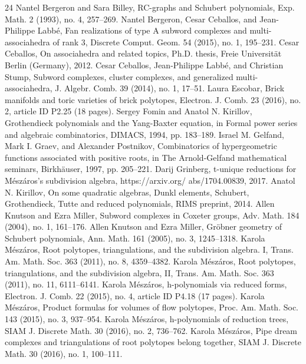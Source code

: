 \begin{thebibliography}{24}
 Nantel Bergeron and Sara Billey, RC-graphs and Schubert polynomials, Exp. Math. 2 (1993), no. 4, 257–269.
 Nantel Bergeron, Cesar Ceballos, and Jean-Philippe Labbé, Fan realizations of type A subword complexes and multi-associahedra of rank 3, Discrete Comput. Geom. 54 (2015), no. 1, 195–231.
 Cesar Ceballos, On associahedra and related topics, Ph.D. thesis, Freie Universität Berlin (Germany), 2012.
 Cesar Ceballos, Jean-Philippe Labbé, and Christian Stump, Subword complexes, cluster complexes, and generalized multi-associahedra, J. Algebr. Comb. 39 (2014), no. 1, 17–51.
 Laura Escobar, Brick manifolds and toric varieties of brick polytopes, Electron. J. Comb. 23 (2016), no. 2, article ID P2.25 (18 pages).
 Sergey Fomin and Anatol N. Kirillov, Grothendieck polynomials and the Yang-Baxter equation, in Formal power series and algebraic combinatorics, DIMACS, 1994, pp. 183–189.
 Israel M. Gelfand, Mark I. Graev, and Alexander Postnikov, Combinatorics of hypergeometric functions associated with positive roots, in The Arnold-Gelfand mathematical seminars, Birkhäuser, 1997, pp. 205–221.
 Darij Grinberg, t-unique reductions for Mészáros’s subdivision algebra, https://arxiv.org/ abs/1704.00839, 2017.
 Anatol N. Kirillov, On some quadratic algebras, Dunkl elements, Schubert, Grothendieck, Tutte and reduced polynomials, RIMS preprint, 2014.
 Allen Knutson and Ezra Miller, Subword complexes in Coxeter groups, Adv. Math. 184 (2004), no. 1, 161–176.
 Allen Knutson and Ezra Miller, Gröbner geometry of Schubert polynomials, Ann. Math. 161 (2005), no. 3, 1245–1318.
 Karola Mészáros, Root polytopes, triangulations, and the subdivision algebra. I, Trans. Am. Math. Soc. 363 (2011), no. 8, 4359–4382.
 Karola Mészáros, Root polytopes, triangulations, and the subdivision algebra, II, Trans. Am. Math. Soc. 363 (2011), no. 11, 6111–6141.
 Karola Mészáros, h-polynomials via reduced forms, Electron. J. Comb. 22 (2015), no. 4, article ID P4.18 (17 pages).
 Karola Mészáros, Product formulas for volumes of flow polytopes, Proc. Am. Math. Soc. 143 (2015), no. 3, 937–954.
 Karola Mészáros, h-polynomials of reduction trees, SIAM J. Discrete Math. 30 (2016), no. 2, 736–762.
 Karola Mészáros, Pipe dream complexes and triangulations of root polytopes belong together, SIAM J. Discrete Math. 30 (2016), no. 1, 100–111.

\end{thebibliography}
